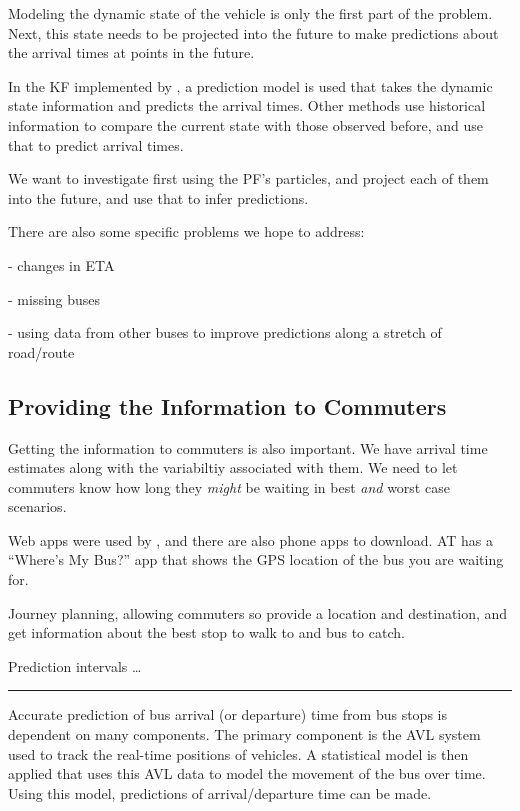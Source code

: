 \documentclass[12pt,a4paper]{article}
\begin{document}
Modeling the dynamic state of the vehicle is only the first part of the problem.
Next, this state needs to be projected into the future to make predictions about
the arrival times at points in the future.

In the KF implemented by \cite{cathey-dailey:2003}, 
a prediction model is used that takes the dynamic state information and predicts the arrival times.
Other methods use historical information to compare the current state with those observed before,
and use that to predict arrival times.

We want to investigate first using the PF's particles, and project each of them into the future, 
and use that to infer predictions.

There are also some specific problems we hope to address:

- changes in ETA

- missing buses

- using data from other buses to improve predictions along a stretch of road/route 


\subsection{Providing the Information to Commuters}
\label{sec:information_to_commuters}

Getting the information to commuters is also important.
We have arrival time estimates along with the variabiltiy associated with them.
We need to let commuters know how long they \emph{might} be waiting in best \emph{and} worst case scenarios.

Web apps were used by \cite{cathey-dailey:2003}, and there are also phone apps to download.
AT has a ``Where's My Bus?'' app that shows the GPS location of the bus you are waiting for.

Journey planning, allowing commuters so provide a location and destination, 
and get information about the best stop to walk to and bus to catch.

Prediction intervals \ldots \cite{mazloumi-etal:2011}


\vspace{1cm}
\hrule
\vspace{1cm}


Accurate prediction of bus arrival (or departure) time from bus stops is dependent on many components.
The primary component is the AVL system used to track the real-time positions of vehicles.
A statistical model is then applied that uses this AVL data to model the movement of the bus over time. 
Using this model, predictions of arrival/departure time can be made.
\end{document}
